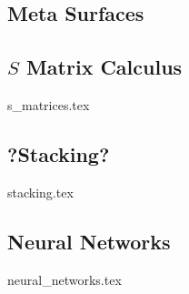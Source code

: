 \subsection{Meta Surfaces}

\subsection{$S$ Matrix Calculus}
{s_matrices.tex}

\subsection{?Stacking?}
{stacking.tex}

\subsection{Neural Networks}
{neural_networks.tex}
